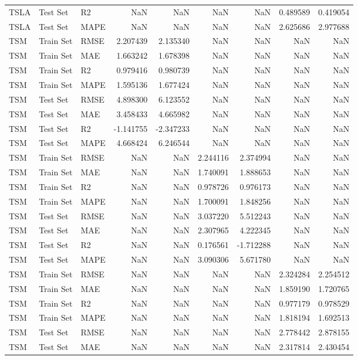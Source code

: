 \begin{tabular}{lllrrrrrr}
TSLA & Test Set & R2 & NaN & NaN & NaN & NaN & 0.489589 & 0.419054 \\
TSLA & Test Set & MAPE & NaN & NaN & NaN & NaN & 2.625686 & 2.977688 \\
TSM & Train Set & RMSE & 2.207439 & 2.135340 & NaN & NaN & NaN & NaN \\
TSM & Train Set & MAE & 1.663242 & 1.678398 & NaN & NaN & NaN & NaN \\
TSM & Train Set & R2 & 0.979416 & 0.980739 & NaN & NaN & NaN & NaN \\
TSM & Train Set & MAPE & 1.595136 & 1.677424 & NaN & NaN & NaN & NaN \\
TSM & Test Set & RMSE & 4.898300 & 6.123552 & NaN & NaN & NaN & NaN \\
TSM & Test Set & MAE & 3.458433 & 4.665982 & NaN & NaN & NaN & NaN \\
TSM & Test Set & R2 & -1.141755 & -2.347233 & NaN & NaN & NaN & NaN \\
TSM & Test Set & MAPE & 4.668424 & 6.246544 & NaN & NaN & NaN & NaN \\
TSM & Train Set & RMSE & NaN & NaN & 2.244116 & 2.374994 & NaN & NaN \\
TSM & Train Set & MAE & NaN & NaN & 1.740091 & 1.888653 & NaN & NaN \\
TSM & Train Set & R2 & NaN & NaN & 0.978726 & 0.976173 & NaN & NaN \\
TSM & Train Set & MAPE & NaN & NaN & 1.700091 & 1.848256 & NaN & NaN \\
TSM & Test Set & RMSE & NaN & NaN & 3.037220 & 5.512243 & NaN & NaN \\
TSM & Test Set & MAE & NaN & NaN & 2.307965 & 4.222345 & NaN & NaN \\
TSM & Test Set & R2 & NaN & NaN & 0.176561 & -1.712288 & NaN & NaN \\
TSM & Test Set & MAPE & NaN & NaN & 3.090306 & 5.671780 & NaN & NaN \\
TSM & Train Set & RMSE & NaN & NaN & NaN & NaN & 2.324284 & 2.254512 \\
TSM & Train Set & MAE & NaN & NaN & NaN & NaN & 1.859190 & 1.720765 \\
TSM & Train Set & R2 & NaN & NaN & NaN & NaN & 0.977179 & 0.978529 \\
TSM & Train Set & MAPE & NaN & NaN & NaN & NaN & 1.818194 & 1.692513 \\
TSM & Test Set & RMSE & NaN & NaN & NaN & NaN & 2.778442 & 2.878155 \\
TSM & Test Set & MAE & NaN & NaN & NaN & NaN & 2.317814 & 2.430454 \\

\end{tabular}
